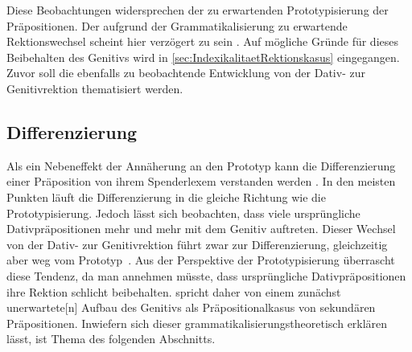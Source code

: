 Diese Beobachtungen widersprechen der zu erwartenden Prototypisierung der Präpositionen. 
Der aufgrund der Grammatikalisierung zu erwartende Rektionswechsel scheint hier verzögert zu sein \citep[s. auch][218--219]{DiMeola2003}. 
Auf mögliche Gründe für dieses Beibehalten des Genitivs wird in \autoref{sec:IndexikalitaetRektionskasus} eingegangen. 
Zuvor soll die ebenfalls zu beobachtende Entwicklung von der Dativ- zur Genitivrektion thematisiert werden. 
\subsection{Differenzierung}
\label{sec:Differenzierung}
Als ein Nebeneffekt der Annäherung an den Prototyp kann die Differenzierung einer Präposition von ihrem Spenderlexem verstanden werden \citep[s.][160--161]{DiMeola2000}.
In den meisten Punkten läuft die Differenzierung in die gleiche Richtung wie die Prototypisierung. 
Jedoch lässt sich beobachten, dass viele ursprüngliche Dativpräpositionen mehr und mehr mit dem Genitiv auftreten. 
Dieser Wechsel von der Dativ- zur Genitivrektion f{\"u}hrt zwar zur Differenzierung, gleichzeitig aber weg vom Prototyp~\citep[s.][162]{DiMeola2000}.
Aus der Perspektive der Prototypisierung überrascht diese Tendenz, da man annehmen müsste, dass ursprüngliche Dativpräpositionen ihre Rektion schlicht beibehalten. 
\citet[33]{Szczepaniak2014} spricht daher von einem zunächst {\glqq}unerwartete[n] Aufbau des Genitivs als Pr{\"a}positionalkasus von sekund{\"a}ren Pr{\"a}positionen{\grqq}. 
Inwiefern sich dieser grammatikalisierungstheoretisch erklären lässt, ist Thema des folgenden Abschnitts. 

